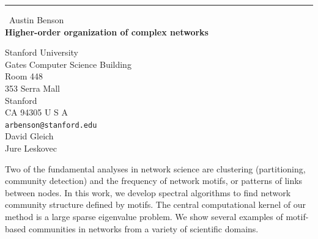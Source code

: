 \documentclass{report}
\begin{document}
\begin{center}
\rule{6in}{1pt} \
{\large Austin Benson \\
{\bf Higher-order organization of complex networks}}

Stanford University \\ Gates Computer Science Building \\ Room 448 \\ 353 Serra Mall \\ Stanford \\ CA 94305 U S A
\\
{\tt arbenson@stanford.edu}\\
David Gleich\\
Jure Leskovec\end{center}

Two of the fundamental analyses in network science are clustering
(partitioning, community detection) and the frequency of network motifs,
or patterns of links between nodes. In this work, we develop spectral
algorithms to find network community structure defined by motifs. The
central computational kernel of our method is a large sparse eigenvalue
problem. We show several examples of motif-based communities in networks
from a variety of scientific domains.
\end{document}

